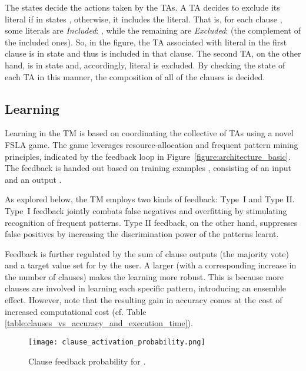\documentclass{article}
\begin{document}
The states decide the actions taken by the TAs. A TA decides to exclude its literal if in states , otherwise, it includes the literal. That is, for each clause , some literals are \emph{Included}: , while the remaining are \emph{Excluded}:  (the complement of the included ones). So, in the figure, the TA associated with literal  in the first clause is in state  and thus  is included in that clause. The second TA, on the other hand, is in state  and, accordingly, literal  is excluded. By checking the state of each TA in this manner, the composition of all of the clauses is decided.

\subsection{Learning}

Learning in the TM is based on coordinating the collective of TAs using a novel FSLA game. The game leverages resource-allocation \cite{Granmo2007d}
and frequent pattern mining \cite{Haugland2014}
principles, indicated by the feedback loop in Figure~\ref{figure:architecture_basic}. The feedback is handed out based on training examples , consisting of an input  and an output .

As explored below, the TM employs two kinds of feedback: Type~I and Type II. Type~I feedback jointly combats false negatives and overfitting by stimulating recognition of frequent patterns. Type II feedback, on the other hand, suppresses false positives by increasing the discrimination power of the patterns learnt.

Feedback is further regulated by the sum of clause outputs  (the majority vote) and a target value  set for  by the user. A larger  (with a corresponding increase in the number of clauses) makes the learning more robust. This is because more clauses are involved in learning each specific pattern, introducing an ensemble effect. However, note that the resulting gain in accuracy comes at the cost of increased computational cost (cf. Table \ref{table:clauses_vs_accuracy_and_execution_time}).

\begin{figure}[ht]
\centering
\texttt{[image: clause\_activation\_probability.png]}
\caption{Clause feedback probability for .}\label{figure:clause_activation_probability}
\end{figure}
\end{document}
